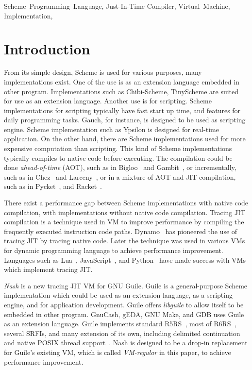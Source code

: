 \documentclass[preprint, 10pt]{sigplanconf}
\begin{document}

\keywords{} Scheme~Programming~Language, Just-In-Time Compiler, Virtual~Machine,
Implementation,

\section{Introduction}

From its simple design, Scheme is used for various purposes, many
implementations exist. One of the use is as an extension language embedded in
other program. Implementations such as Chibi-Scheme, TinyScheme are suited for
use as an extension language. Another use is for scripting. Scheme
implementations for scripting typically have fast start up time, and features
for daily programming tasks. Gauch, for instance, is designed to be used as
scripting engine. Scheme implementation such as Ypsilon is designed for
real-time application. On the other hand, there are Scheme implementations used
for more expensive computation than scripting. This kind of Scheme
implementations typically compiles to native code before executing. The
compilation could be done \textit{ahead-of-time} (AOT), such as in
Bigloo~\cite{serrano1995bigloo} and Gambit~\cite{feeley1998gambit}, or
incrementally, such as in Chez~\cite{dybvig2006development} and
Larceny~\cite{hansen1992impact}, or in a mixture of AOT and JIT compilation,
such as in Pycket~\cite{bauman2015pycket}, and Racket~\cite{flatt2013racket}.

There exist a performance gap between Scheme implementations with native code
compilation, with implementations without native code compilation. Tracing JIT
compilation is a technique used in VM to improve performance by compiling the
frequently executed instruction code paths. Dynamo~\cite{bala2000dynamo} has
pioneered the use of tracing JIT by tracing native code. Later the technique was
used in various VMs for dynamic programming language to achieve performance
improvement. Languages such as Lua~\cite{pall2016luajit},
JavaScript~\cite{gal2009trace}, and Python~\cite{bolz2009tracing} have made
success with VMs which implement tracing JIT.\@

\textit{Nash} is a new tracing JIT VM for GNU Guile. Guile is a general-purpose
Scheme implementation which could be used as an extension language, as a
scripting engine, and for application development. Guile offers
\textit{libguile} to allow itself to be embedded in other program. GnuCash,
gEDA, GNU Make, and GDB uses Guile as an extension language. Guile implements
standard R5RS~\cite{abelson1998revised5}, most of
R6RS~\cite{sperber2010revised}, several SRFIs, and many extension of its own,
including delimited continuation and native POSIX thread
support~\cite{Galassi02guilereference}. Nash is designed to be a drop-in
replacement for Guile's existing VM, which is called \textit{VM-regular} in this
paper, to achieve performance improvement.
\end{document}
